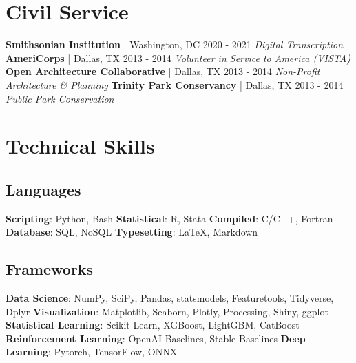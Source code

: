 \documentclass{article}
\begin{document}
    \section*{Civil Service}
        \textbf{Smithsonian Institution} | Washington, DC \hfill{2020 - 2021}\newline
        \textit{Digital Transcription}\newline\newline
        \textbf{AmeriCorps} | Dallas, TX \hfill{2013 - 2014}\newline
        \textit{Volunteer in Service to America (VISTA)}\newline\newline
        \textbf{Open Architecture Collaborative} | Dallas, TX \hfill{2013 - 2014}\newline
        \textit{Non-Profit Architecture \& Planning}\newline\newline
        \textbf{Trinity Park Conservancy} | Dallas, TX \hfill{2013 - 2014}\newline
        \textit{Public Park Conservation}
    \section*{Technical Skills}
    \subsection*{Languages}
        \textbf{Scripting}: Python, Bash\newline
        \textbf{Statistical}: R, Stata\newline
        \textbf{Compiled}: C/C++, Fortran\newline
        \textbf{Database}: SQL, NoSQL\newline
        \textbf{Typesetting}: \LaTeX, Markdown
    \subsection*{Frameworks}
        \textbf{Data Science}: NumPy, SciPy, Pandas, statsmodels, Featuretools, Tidyverse, Dplyr\newline
        \textbf{Visualization}: Matplotlib, Seaborn, Plotly, Processing, Shiny, ggplot\newline
        \textbf{Statistical Learning}: Scikit-Learn, XGBoost, LightGBM, CatBoost\newline
        \textbf{Reinforcement Learning}: OpenAI Baselines, Stable Baselines\newline
        \textbf{Deep Learning}: Pytorch, TensorFlow, ONNX
\end{document}
